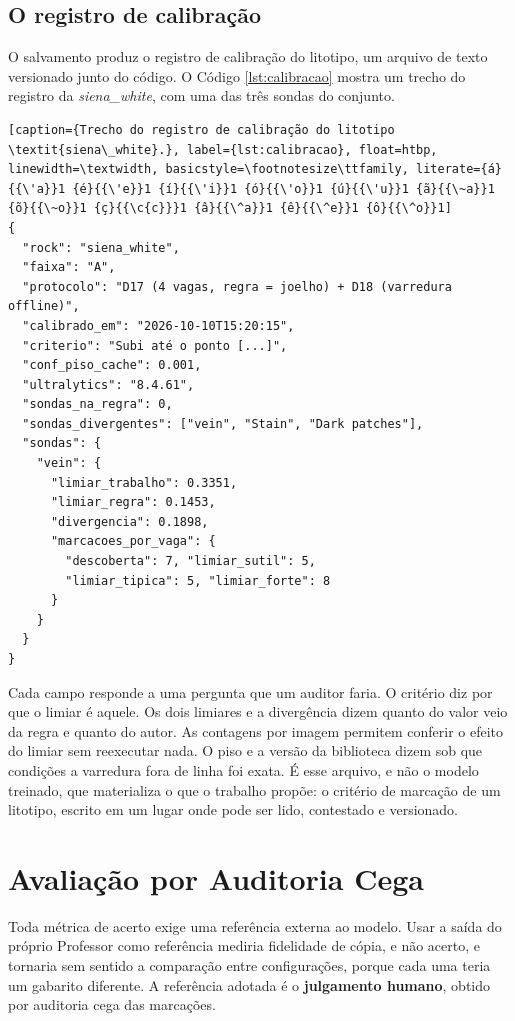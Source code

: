 \subsection{O registro de calibração}

O salvamento produz o registro de calibração do litotipo, um arquivo de texto versionado junto do código. O Código \ref{lst:calibracao} mostra um trecho do registro da \textit{siena\_white}, com uma das três sondas do conjunto.

\begin{lstlisting}[caption={Trecho do registro de calibração do litotipo \textit{siena\_white}.}, label={lst:calibracao}, float=htbp, linewidth=\textwidth, basicstyle=\footnotesize\ttfamily, literate={á}{{\'a}}1 {é}{{\'e}}1 {í}{{\'i}}1 {ó}{{\'o}}1 {ú}{{\'u}}1 {ã}{{\~a}}1 {õ}{{\~o}}1 {ç}{{\c{c}}}1 {â}{{\^a}}1 {ê}{{\^e}}1 {ô}{{\^o}}1]
{
  "rock": "siena_white",
  "faixa": "A",
  "protocolo": "D17 (4 vagas, regra = joelho) + D18 (varredura offline)",
  "calibrado_em": "2026-10-10T15:20:15",
  "criterio": "Subi até o ponto [...]",
  "conf_piso_cache": 0.001,
  "ultralytics": "8.4.61",
  "sondas_na_regra": 0,
  "sondas_divergentes": ["vein", "Stain", "Dark patches"],
  "sondas": {
    "vein": {
      "limiar_trabalho": 0.3351,
      "limiar_regra": 0.1453,
      "divergencia": 0.1898,
      "marcacoes_por_vaga": {
        "descoberta": 7, "limiar_sutil": 5,
        "limiar_tipica": 5, "limiar_forte": 8
      }
    }
  }
}
\end{lstlisting}

Cada campo responde a uma pergunta que um auditor faria. O critério diz por que o limiar é aquele. Os dois limiares e a divergência dizem quanto do valor veio da regra e quanto do autor. As contagens por imagem permitem conferir o efeito do limiar sem reexecutar nada. O piso e a versão da biblioteca dizem sob que condições a varredura fora de linha foi exata. É esse arquivo, e não o modelo treinado, que materializa o que o trabalho propõe: o critério de marcação de um litotipo, escrito em um lugar onde pode ser lido, contestado e versionado.

\section{Avaliação por Auditoria Cega}
\label{sec:referencia}

Toda métrica de acerto exige uma referência externa ao modelo. Usar a saída do próprio Professor como referência mediria fidelidade de cópia, e não acerto, e tornaria sem sentido a comparação entre configurações, porque cada uma teria um gabarito diferente. A referência adotada é o \textbf{julgamento humano}, obtido por auditoria cega das marcações.

